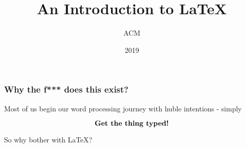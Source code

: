 \documentclass{beamer}
\title{An Introduction to \LaTeX}
\author{ACM}
\institute{New York University}
\date{2019}
\begin{document}
 
\frame{\titlepage}
 
\begin{frame}
\frametitle{Why the f*** does this exist?}
Most of us begin our word processing journey with huble intentions - simply

$$
\text{\textbf{Get the thing typed!}}
$$

So why bother with \LaTeX ?
\end{frame}
 
\end{document}
